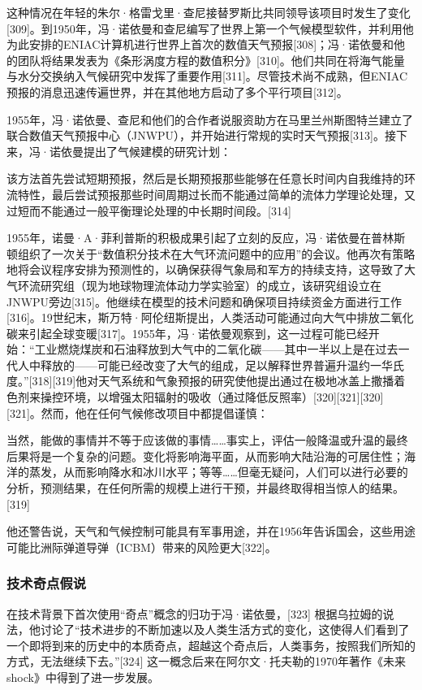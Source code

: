 这种情况在年轻的朱尔·格雷戈里·查尼接替罗斯比共同领导该项目时发生了变化[309]。到1950年，冯·诺依曼和查尼编写了世界上第一个气候模型软件，并利用他为此安排的ENIAC计算机进行世界上首次的数值天气预报[308]；冯·诺依曼和他的团队将结果发表为《条形涡度方程的数值积分》[310]。他们共同在将海气能量与水分交换纳入气候研究中发挥了重要作用[311]。尽管技术尚不成熟，但ENIAC预报的消息迅速传遍世界，并在其他地方启动了多个平行项目[312]。

1955年，冯·诺依曼、查尼和他们的合作者说服资助方在马里兰州斯图特兰建立了联合数值天气预报中心（JNWPU），并开始进行常规的实时天气预报[313]。接下来，冯·诺依曼提出了气候建模的研究计划：

该方法首先尝试短期预报，然后是长期预报那些能够在任意长时间内自我维持的环流特性，最后尝试预报那些时间周期过长而不能通过简单的流体力学理论处理，又过短而不能通过一般平衡理论处理的中长期时间段。[314]

1955年，诺曼·A·菲利普斯的积极成果引起了立刻的反应，冯·诺依曼在普林斯顿组织了一次关于“数值积分技术在大气环流问题中的应用”的会议。他再次有策略地将会议程序安排为预测性的，以确保获得气象局和军方的持续支持，这导致了大气环流研究组（现为地球物理流体动力学实验室）的成立，该研究组设立在JNWPU旁边[315]。他继续在模型的技术问题和确保项目持续资金方面进行工作[316]。19世纪末，斯万特·阿伦纽斯提出，人类活动可能通过向大气中排放二氧化碳来引起全球变暖[317]。1955年，冯·诺依曼观察到，这一过程可能已经开始：“工业燃烧煤炭和石油释放到大气中的二氧化碳——其中一半以上是在过去一代人中释放的——可能已经改变了大气的组成，足以解释世界普遍升温约一华氏度。”[318][319]他对天气系统和气象预报的研究使他提出通过在极地冰盖上撒播着色剂来操控环境，以增强太阳辐射的吸收（通过降低反照率）[320][321][320][321]。然而，他在任何气候修改项目中都提倡谨慎：

当然，能做的事情并不等于应该做的事情……事实上，评估一般降温或升温的最终后果将是一个复杂的问题。变化将影响海平面，从而影响大陆沿海的可居住性；海洋的蒸发，从而影响降水和冰川水平；等等……但毫无疑问，人们可以进行必要的分析，预测结果，在任何所需的规模上进行干预，并最终取得相当惊人的结果。[319]

他还警告说，天气和气候控制可能具有军事用途，并在1956年告诉国会，这些用途可能比洲际弹道导弹（ICBM）带来的风险更大[322]。
\subsubsection{技术奇点假说}
在技术背景下首次使用“奇点”概念的归功于冯·诺依曼，[323] 根据乌拉姆的说法，他讨论了“技术进步的不断加速以及人类生活方式的变化，这使得人们看到了一个即将到来的历史中的本质奇点，超越这个奇点后，人类事务，按照我们所知的方式，无法继续下去。”[324] 这一概念后来在阿尔文·托夫勒的1970年著作《未来 shock》中得到了进一步发展。
